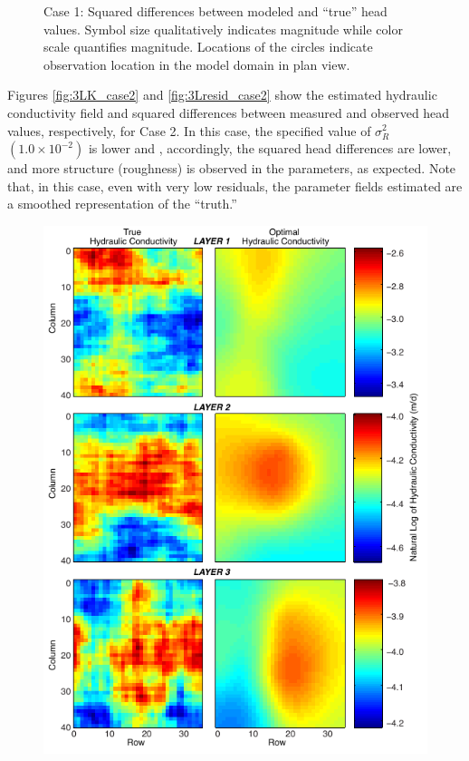 \documentclass[11pt,oneside,onecolumn]{usgsreport}
\begin{document}
\begin{appendix}
\begin{figure}[H]
\caption{\label{fig:3Lresid_case1}Case 1: Squared differences between modeled
and ``true'' head values. Symbol size qualitatively indicates magnitude
while color scale quantifies magnitude. Locations of the circles indicate
observation location in the model domain in plan view.}
\end{figure}


Figures \ref{fig:3LK_case2} and \ref{fig:3Lresid_case2} show the
estimated hydraulic conductivity field and squared differences between
measured and observed head values, respectively, for Case 2. In this
case, the specified value of $\sigma_{R}^{2}$ $\left(1.0\times10^{-2}\right)$
is lower and , accordingly, the squared head differences are lower,
and more structure (roughness) is observed in the parameters, as expected.
Note that, in this case, even with very low residuals, the parameter
fields estimated are a smoothed representation of the ``truth.'' 

\begin{figure}[H]
\begin{center}\includegraphics{figures/3KL_case2}\end{center}


\end{figure}
\end{appendix}
\end{document}
